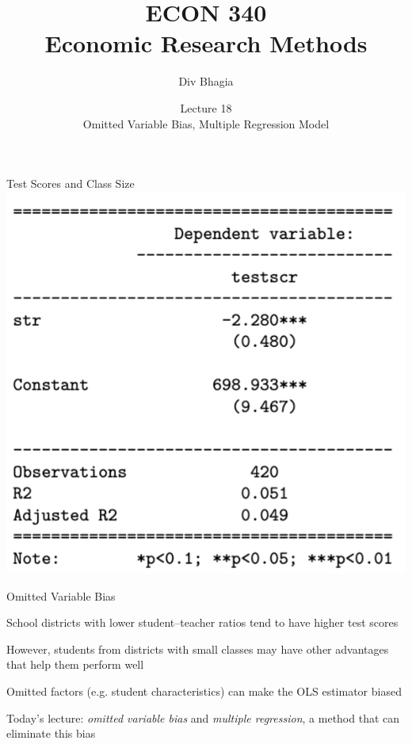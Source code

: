 \documentclass{./../div_teaching_slides}
\begin{document}
\title{ECON 340 \\ Economic Research Methods}
\author{Div Bhagia}
\date{Lecture 18 \\ Omitted Variable Bias, Multiple Regression Model}

\begin{frame}
\maketitle
\end{frame}

\begin{frame}{Test Scores and Class Size}
\vspace{-0.5em}
\centering
\includegraphics[scale=0.375]{reg_output_stargazer.png}
\end{frame}

\begin{frame}{Omitted Variable Bias}
\begin{witemize}
  \item School districts with lower student–teacher ratios tend to have higher test scores
  \item However, students from districts with small classes may have other advantages that help them perform well
  \item Omitted factors (e.g. student characteristics) can make the OLS estimator biased
  \item Today's lecture: \textit{omitted variable bias} and \textit{multiple regression}, a method that can eliminate this bias
\end{witemize}
\end{frame}
\end{document}
